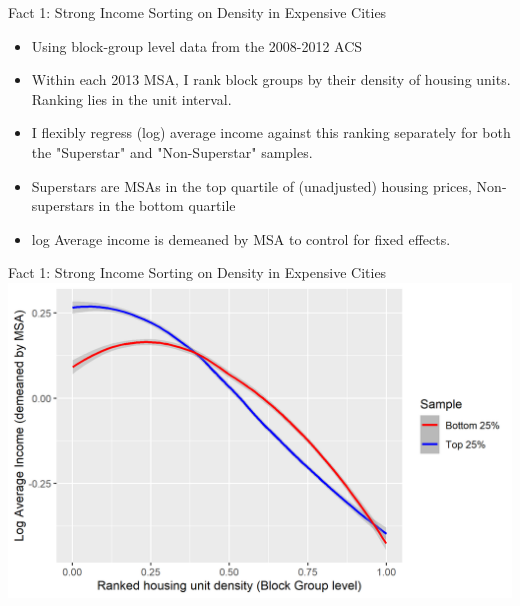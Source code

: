 \documentclass{beamer}
\begin{document}
\begin{frame}{Fact 1: Strong Income Sorting on Density in Expensive Cities}
\begin{itemize}
	\itemsep1em
	\color{black} \pause
	\item Using block-group level data from the 2008-2012 ACS \pause
	\item Within each 2013 MSA, I rank block groups by their density of housing units. Ranking lies in the unit interval. \pause
	\item I flexibly regress (log) average income against this ranking separately for both the "Superstar" and "Non-Superstar" samples. \pause
	\item Superstars are MSAs in the top quartile of (unadjusted) housing prices, Non-superstars in the bottom quartile \pause
	\item log Average income is demeaned by MSA to control for fixed effects.
\end{itemize}
\end{frame}

\begin{frame}{Fact 1: Strong Income Sorting on Density in Expensive Cities}\label{Fact1}
	\includegraphics[width= \textwidth]{income.png}
	\hyperlink{Ctfl_Income_gradient}{} 
\end{frame}
\end{document}
